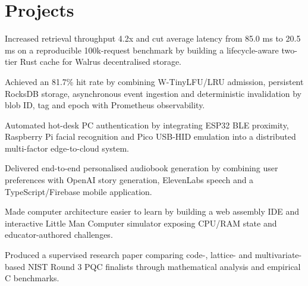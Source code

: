 \section{Projects}

\begin{resumeBullets}
  \item Increased retrieval throughput 4.2x and cut average latency from 85.0 ms to 20.5 ms on a reproducible 100k-request benchmark by building a lifecycle-aware two-tier Rust cache for Walrus decentralised storage.
  \item Achieved an 81.7\% hit rate by combining W-TinyLFU/LRU admission, persistent RocksDB storage, asynchronous event ingestion and deterministic invalidation by blob ID, tag and epoch with Prometheus observability.
\end{resumeBullets}

\begin{resumeBullets}
  \item Automated hot-desk PC authentication by integrating ESP32 BLE proximity, Raspberry Pi facial recognition and Pico USB-HID emulation into a distributed multi-factor edge-to-cloud system.
\end{resumeBullets}

\begin{resumeBullets}
  \item Delivered end-to-end personalised audiobook generation by combining user preferences with OpenAI story generation, ElevenLabs speech and a TypeScript/Firebase mobile application.
\end{resumeBullets}

\begin{resumeBullets}
  \item Made computer architecture easier to learn by building a web assembly IDE and interactive Little Man Computer simulator exposing CPU/RAM state and educator-authored challenges.
\end{resumeBullets}

\begin{resumeBullets}
  \item Produced a supervised research paper comparing code-, lattice- and multivariate-based NIST Round 3 PQC finalists through mathematical analysis and empirical C benchmarks.
\end{resumeBullets}

